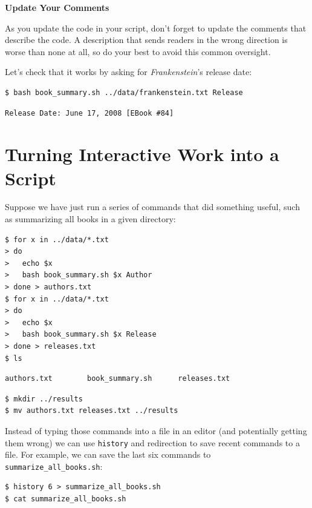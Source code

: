 \documentclass[
]{krantz}
\renewenvironment{quote}{\begin{VF}}{\end{VF}}
\begin{document}
\begin{quote}
\textbf{Update Your Comments}

As you update the code in your script,
don't forget to update the comments that describe the code.
A description that sends readers in the wrong direction is worse than none at all,
so do your best to avoid this common oversight.
\end{quote}

Let's check that it works by asking for \emph{Frankenstein}'s release date:

\begin{verbatim}
$ bash book_summary.sh ../data/frankenstein.txt Release
\end{verbatim}

\begin{verbatim}
Release Date: June 17, 2008 [EBook #84]
\end{verbatim}

\hypertarget{bash-advanced-capture}{%
\section{Turning Interactive Work into a Script}\label{bash-advanced-capture}}

Suppose we have just run a series of commands that did something useful,
such as summarizing all books in a given directory:

\begin{verbatim}
$ for x in ../data/*.txt
> do 
>   echo $x
>   bash book_summary.sh $x Author 
> done > authors.txt
$ for x in ../data/*.txt
> do 
>   echo $x
>   bash book_summary.sh $x Release 
> done > releases.txt
$ ls
\end{verbatim}

\begin{verbatim}
authors.txt        book_summary.sh      releases.txt
\end{verbatim}

\begin{verbatim}
$ mkdir ../results
$ mv authors.txt releases.txt ../results
\end{verbatim}

Instead of typing those commands into a file in an editor
(and potentially getting them wrong)
we can use \texttt{history} and redirection to save recent commands to a file.
For example,
we can save the last six commands to \texttt{summarize\_all\_books.sh}:

\begin{verbatim}
$ history 6 > summarize_all_books.sh
$ cat summarize_all_books.sh
\end{verbatim}
\end{document}
